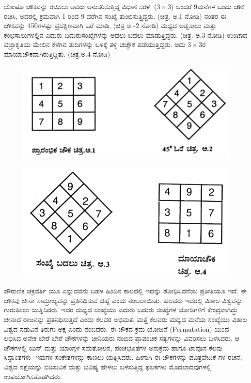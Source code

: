ಲೋಷೂ ಚೌಕವನ್ನು ರಚಿಸಲು ಅವರು ಅನುಸರಿಸುತ್ತಿದ್ದ ವಿಧಾನ ಸರಳ. ($3 \times 3$) ಅಂದರೆ 9ಮನೆಗಳ ಒಂದು ಚೌಕ ರಚಿಸಿ, ಅದರಲ್ಲಿ ಕ್ರಮವಾಗಿ 1 ರಿಂದ 9 ವರೆಗಿನ ಸಂಖ್ಯೆ ತುಂಬಿಸುತ್ತಿದ್ದರು. (ಚಿತ್ರ. ಅ.1 ನೋಡಿ) ನಂತರ ಈ ಚೌಕವನ್ನು 450ಗಳಷ್ಟು ಪ್ರದಕ್ಷಿಣವಾಗಿ ಓರೆ ಮಾಡಿ, (ಚಿತ್ರ ಅ -2 ನೋಡಿ) ಮಧ್ಯದ ಅಡ್ಡಸಾಲು ಮತ್ತು ಕಂಭಸಾಲುಗಳಲ್ಲಿನ ಎದುರು ಬದುರುಸಂಖ್ಯೆಗಳನ್ನು ಅದಲು ಬದಲು ಮಾಡುತ್ತಿದ್ದರು. (ಚಿತ್ರ. ಅ.3 ನೋಡಿ) ಉಂಟಾದ ವಜ್ರಾಕೃತಿಯ ಮೇಲಿನ ಕೆಳಗಿನ ತುದಿಗಳನ್ನು ಒಳಕ್ಕೆ ತಳ್ಳಿ ಚಚ್ಚೌಕ ಪಡೆಯುತ್ತಿದ್ದರು. ಅದು $3 \times 3$ರ ಮಾಯಾಚೌಕವಾಗಿರುತ್ತಿದ್ದಿತು. (ಚಿತ್ರ.ಅ.4 ನೋಡಿ)
\begin{figure}[H]
\includegraphics{src/figures/chap9/fig9.2.jpg}
\end{figure}
\begin{figure}[H]
\includegraphics{src/figures/chap9/fig9.3.jpg}
\end{figure}

ಪೌರಾಣಿಕ ಚಕ್ರವರ್ತಿ ಯೂ ಎನ್ನುವವನು ಬಹಳ ಹಿಂದಿನ ಕಾಲದಲ್ಲಿ ಇದನ್ನು ಶೋಧಿಸಿದನೆಂಬ ಪ್ರತೀತಿಯೂ ಇದೆ. ಈ ಚೌಕವು ಚೀನಾ ಸಾಮ್ರಾಜ್ಯವನ್ನು ಪ್ರತಿನಿಧಿಸುವ ಚಿಹ್ನೆ ಎಂದು ನಂಬಲಾಯಿತು. ಹಲವರು ಇದರಲ್ಲಿ ವಿಶಾಲ ವಿಶ್ವವನ್ನು ಗುರುತಿಸಲು ಯತ್ನಿಸಿದರು. ಇದರ ಮಧ್ಯದ ಸಂಖ್ಯೆಯು ಎದುರು ಬದುರು ಸಂಖ್ಯೆಗಳ ಜೋಡಿಗಳಿಗೆ ಕೇಂದ್ರವಾಗಿದ್ದು ಚೀನಾದ ರಾಜನನ್ನು ಪ್ರತಿನಿಧಿಸುತ್ತದೆ ಎಂದು ಕೆಲವರ ಅಭಿಮತ. ಮತ್ತೆ ಕೆಲವರು ಮಧ್ಯದ ಮನೆಯ ಸಂಖ್ಯೆಯು ವಿಶಾಲ ವಿಶ್ವದ ನಡುವಿನ ತಿರುಗು ಅಕ್ಷ ಎಂದು ನಂಬಿದರು. ಈ ಚೌಕದ ಕ್ರಮ ಯೋಜನೆ (Permutation) ಯಿಂದ ಲಭಿಸಿದ ಅನೇಕ ಬೇರೆ ಬೇರೆ ಚೌಕಗಳನ್ನು ಚೀನಿಯರು ನಂಬಿದ ಪ್ರಾಪಂಚಿಕ ಸತ್ಯಗಳನ್ನು ವಿವರಿಸಲು ಬಳಸಿದರು. ಆ ಚೌಕಗಳಲ್ಲಿ ಯಿನ್ ಮತ್ತು ಯಾಂಗ್ಗಳ ಸಮತೋಲನ, ಪಂಚಭೂತಗಳ ಅನುಕ್ರಮ ಹಾಗೂ ಟಾವೊನ ಕೆಲವು ಸಿದ್ಧಾಂತಗಳು- ಇವುಗಳ ಸಂಕೇತಗಳನ್ನು ಕಾಣಲು ಯತ್ನಿಸಿದರು. ಹೀಗಾಗಿ ಈ ಚೌಕಗಳನ್ನು ಪವಿತ್ರವೇದಿಕೆ ಗಳ ರಚನೆ, ವಿಶ್ವದ ನಕ್ಷೆಯನ್ನು ಬಿಡಿಸುವಿಕೆ ಮತ್ತು ಭವಿಷ್ಯ ಹೇಳಲು ಬಳಸುತ್ತಿದ್ದ ಫಲಕಗಳು ಮೊದಲಾದವುಗಳಲ್ಲಿ ಉಪಯೋಗಿಸತೊಡಗಿದರು.

